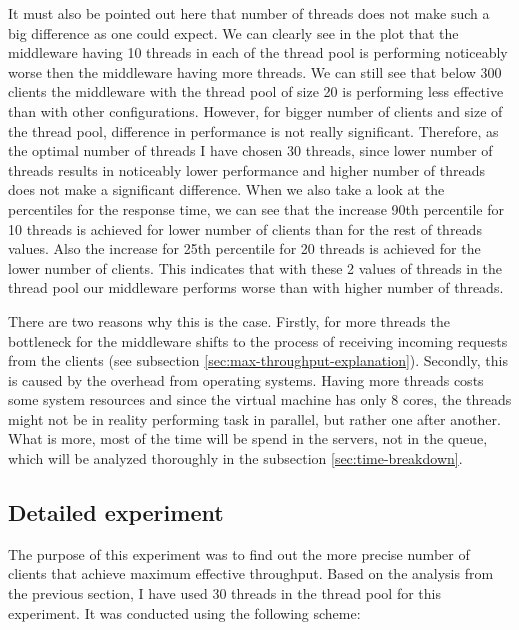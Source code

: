 \documentclass[11pt]{article}
\begin{document}
It must also be pointed out here that number of threads does not make such a big difference as one could expect. We can clearly see in the plot that the middleware having 10 threads in each of the thread pool is performing noticeably worse then the middleware having more threads. We can still see that below 300 clients the middleware with the thread pool of size 20 is performing less effective than with other configurations. However, for bigger number of clients and size of the thread pool, difference in performance is not really significant. Therefore, as the optimal number of threads I have chosen 30 threads, since lower number of threads results in noticeably lower performance and higher number of threads does not make a significant difference. When we also take a look at the percentiles for the response time, we can see that the increase 90th percentile for 10 threads is achieved for lower number of clients than for the rest of threads values. Also the increase for 25th percentile for 20 threads is achieved for the lower number of clients. This indicates that with these 2 values of threads in the thread pool our middleware performs worse than with higher number of threads.

There are two reasons why this is the case. Firstly, for more threads the bottleneck for the middleware shifts to the process of receiving incoming requests from the clients (see subsection \ref{sec:max-throughput-explanation}).  Secondly, this is caused by %
the overhead from operating systems. Having more threads costs some system resources and since the virtual machine has only 8 cores, the threads might not be in reality performing task in parallel, but rather one after another. What is more, most of the time will be spend in the servers, not in the queue, which will be analyzed thoroughly in the subsection \ref{sec:time-breakdown}.

\subsection{Detailed experiment}

The purpose of this experiment was to find out the more precise number of clients that achieve maximum effective throughput. Based on the analysis from the previous section, I have used 30 threads in the thread pool for this experiment. It was conducted using the following scheme:
\medskip
\end{document}
